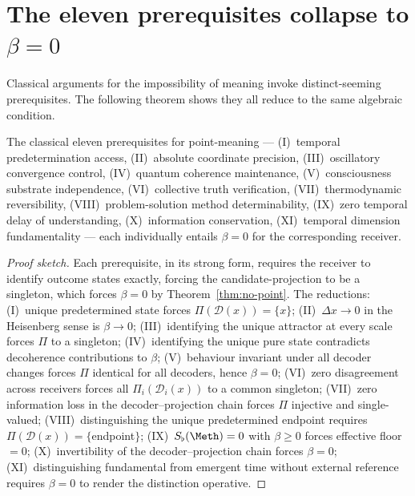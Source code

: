 \section{The eleven prerequisites collapse to \texorpdfstring{$\beta=0$}{beta=0}}
\label{sec:ch03-eleven}

Classical arguments for the impossibility of meaning invoke distinct-seeming
prerequisites. The following theorem shows they all reduce to the same
algebraic condition.

\begin{theorem}\label{thm:11-collapse}
The classical eleven prerequisites for point-meaning ---
(I)~temporal predetermination access,
(II)~absolute coordinate precision,
(III)~oscillatory convergence control,
(IV)~quantum coherence maintenance,
(V)~consciousness substrate independence,
(VI)~collective truth verification,
(VII)~thermodynamic reversibility,
(VIII)~problem-solution method determinability,
(IX)~zero temporal delay of understanding,
(X)~information conservation,
(XI)~temporal dimension fundamentality ---
each individually entails $\beta=0$ for the corresponding receiver.
\end{theorem}

\begin{proof}[Proof sketch]
Each prerequisite, in its strong form, requires the receiver to identify
outcome states exactly, forcing the candidate-projection to be a singleton,
which forces $\beta=0$ by Theorem~\ref{thm:no-point}. The reductions:
(I)~unique predetermined state forces $\Pi(\mathcal{D}(x))=\{x\}$;
(II)~$\Delta x\to 0$ in the Heisenberg sense is $\beta\to 0$;
(III)~identifying the unique attractor at every scale forces $\Pi$ to a
singleton;
(IV)~identifying the unique pure state contradicts decoherence contributions
to $\beta$;
(V)~behaviour invariant under all decoder changes forces $\Pi$ identical for
all decoders, hence $\beta=0$;
(VI)~zero disagreement across receivers forces all $\Pi_i(\mathcal{D}_i(x))$
to a common singleton;
(VII)~zero information loss in the decoder--projection chain forces $\Pi$
injective and single-valued;
(VIII)~distinguishing the unique predetermined endpoint requires
$\Pi(\mathcal{D}(x))=\{$endpoint$\}$;
(IX)~$\Sfloor(\Meth)=0$ with $\beta\ge 0$ forces effective floor $=0$;
(X)~invertibility of the decoder--projection chain forces $\beta=0$;
(XI)~distinguishing fundamental from emergent time without external reference
requires $\beta=0$ to render the distinction operative.
\end{proof}

